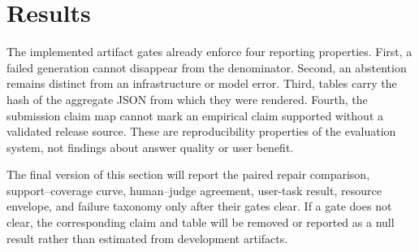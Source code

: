 \section{Results}
\ifreleasetables
  
\else
\fi

The implemented artifact gates already enforce four reporting properties. First, a failed generation cannot disappear from the denominator. Second, an abstention remains distinct from an infrastructure or model error. Third, tables carry the hash of the aggregate JSON from which they were rendered. Fourth, the submission claim map cannot mark an empirical claim supported without a validated release source. These are reproducibility properties of the evaluation system, not findings about answer quality or user benefit.

The final version of this section will report the paired repair comparison, support--coverage curve, human--judge agreement, user-task result, resource envelope, and failure taxonomy only after their gates clear. If a gate does not clear, the corresponding claim and table will be removed or reported as a null result rather than estimated from development artifacts.
